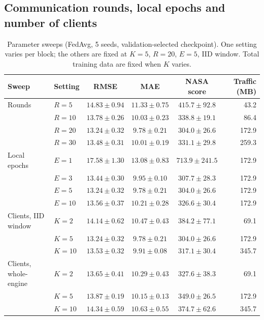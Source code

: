 \subsection{Communication rounds, local epochs and number of clients}

\begin{table}[t]
\centering
\caption{Parameter sweeps (FedAvg, 5 seeds, validation-selected checkpoint). One
setting varies per block; the others are fixed at $K=5$, $R=20$, $E=5$, IID
window. Total training data are fixed when $K$ varies.}\label{tab:sweeps}
\begin{tabular}{llcccr}
\hline
Sweep & Setting & RMSE & MAE & NASA score & Traffic (MB)\\
\hline
Rounds       & $R=5$  & $14.83\pm0.94$ & $11.33\pm0.75$ & $415.7\pm92.8$ & 43.2\\
             & $R=10$ & $13.78\pm0.26$ & $10.03\pm0.23$ & $338.8\pm19.1$ & 86.4\\
             & $R=20$ & $13.24\pm0.32$ & $9.78\pm0.21$  & $304.0\pm26.6$ & 172.9\\
             & $R=30$ & $13.48\pm0.31$ & $10.01\pm0.19$ & $331.1\pm29.8$ & 259.3\\
\hline
Local epochs & $E=1$  & $17.58\pm1.30$ & $13.08\pm0.83$ & $713.9\pm241.5$ & 172.9\\
             & $E=3$  & $13.44\pm0.30$ & $9.95\pm0.10$  & $307.7\pm28.3$ & 172.9\\
             & $E=5$  & $13.24\pm0.32$ & $9.78\pm0.21$  & $304.0\pm26.6$ & 172.9\\
             & $E=10$ & $13.56\pm0.37$ & $10.21\pm0.28$ & $326.6\pm30.4$ & 172.9\\
\hline
Clients, IID window & $K=2$  & $14.14\pm0.62$ & $10.47\pm0.43$ & $384.2\pm77.1$ & 69.1\\
             & $K=5$  & $13.24\pm0.32$ & $9.78\pm0.21$  & $304.0\pm26.6$ & 172.9\\
             & $K=10$ & $13.53\pm0.32$ & $9.91\pm0.08$  & $317.1\pm30.4$ & 345.7\\
\hline
Clients, whole-engine & $K=2$  & $13.65\pm0.41$ & $10.29\pm0.43$ & $327.6\pm38.3$ & 69.1\\
             & $K=5$  & $13.87\pm0.19$ & $10.15\pm0.13$ & $349.0\pm26.5$ & 172.9\\
             & $K=10$ & $14.34\pm0.59$ & $10.63\pm0.55$ & $374.7\pm62.6$ & 345.7\\
\hline
\end{tabular}
\end{table}

